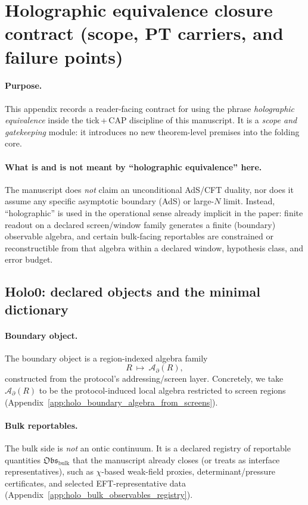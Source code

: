 \section{Holographic equivalence closure contract (scope, PT carriers, and failure points)}
\label{app:holo_scope_contract}

\paragraph{Purpose.}
\AuditTag This appendix records a reader-facing contract for using the phrase \emph{holographic equivalence}
inside the tick\,+\,CAP discipline of this manuscript.
It is a \emph{scope and gatekeeping} module: it introduces no new theorem-level premises into the folding core.

\paragraph{What is and is not meant by ``holographic equivalence'' here.}
\AuditTag The manuscript does \emph{not} claim an unconditional AdS/CFT duality, nor does it assume any specific
asymptotic boundary (AdS) or large-$N$ limit.
Instead, ``holographic'' is used in the operational sense already implicit in the paper:
finite readout on a declared screen/window family generates a finite (boundary) observable algebra,
and certain bulk-facing reportables are constrained or reconstructible from that algebra within a declared
window, hypothesis class, and error budget.

\subsection{Holo0: declared objects and the minimal dictionary}
\label{subsec:holo0_declared_objects}

\paragraph{Boundary object.}
\InterfaceTag The boundary object is a region-indexed algebra family
\[
R\ \longmapsto\ \mathcal{A}_{\partial}(R),
\]
constructed from the protocol's addressing/screen layer.
Concretely, we take $\mathcal{A}_{\partial}(R)$ to be the protocol-induced local algebra
restricted to screen regions (Appendix~\ref{app:holo_boundary_algebra_from_screens}).

\paragraph{Bulk reportables.}
\InterfaceTag The bulk side is \emph{not} an ontic continuum.
It is a declared registry of reportable quantities $\mathfrak{Obs}_{\mathrm{bulk}}$
that the manuscript already closes (or treats as interface representatives),
such as $\chi$-based weak-field proxies, determinant/pressure certificates, and selected EFT-representative data
(Appendix~\ref{app:holo_bulk_observables_registry}).

